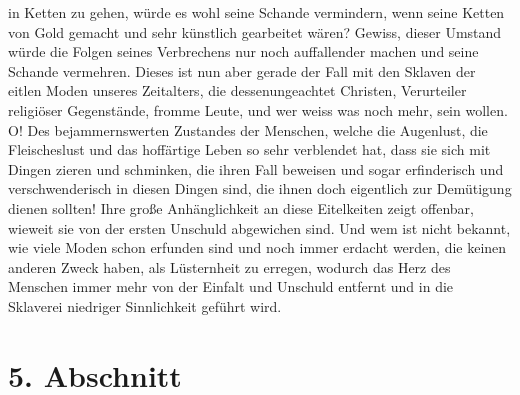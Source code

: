 in Ketten zu gehen, würde es wohl seine Schande vermindern, wenn seine Ketten
von Gold gemacht und sehr künstlich gearbeitet wären? Gewiss, dieser Umstand
würde die Folgen seines Verbrechens nur noch auffallender machen und seine
Schande vermehren. Dieses ist nun aber gerade der Fall mit den Sklaven der
eitlen Moden unseres Zeitalters, die dessenungeachtet Christen, Verurteiler
religiöser Gegenstände, fromme Leute, und wer weiss was noch mehr, sein wollen.
O! Des bejammernswerten Zustandes der Menschen, welche die Augenlust, die
Fleischeslust und das hoffärtige Leben so sehr verblendet hat, dass sie sich mit
Dingen zieren und schminken, die ihren Fall beweisen und sogar erfinderisch und
verschwenderisch in diesen Dingen sind, die ihnen doch eigentlich zur
Demütigung dienen sollten! Ihre große Anhänglichkeit an diese Eitelkeiten
zeigt offenbar, wieweit sie von der ersten Unschuld abgewichen sind. Und wem ist
nicht bekannt, wie viele Moden schon erfunden sind und noch immer erdacht
werden, die keinen anderen Zweck haben, als Lüsternheit zu erregen, wodurch das
Herz des Menschen immer mehr von der Einfalt und Unschuld entfernt und in die
Sklaverei niedriger Sinnlichkeit geführt wird.

\section{5. Abschnitt} \label{kap14_ab5}

